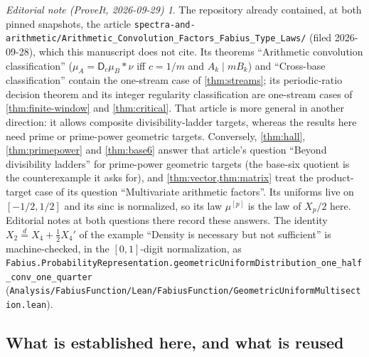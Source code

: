 \documentclass[11pt,a4paper]{article}
\theoremstyle{remark}
\newtheorem*{ednote}{Editorial note (ProveIt, 2026-09-29)}
\newcommand{\eqd}{\overset{d}{=}}
\newcommand{\pathtext}[1]{\nolinkurl{#1}}
\begin{document}
\begin{ednote}
The repository already contained, at both pinned snapshots, the article
\pathtext{spectra-and-arithmetic/Arithmetic_Convolution_Factors_Fabius_Type_Laws/}
(filed 2026-09-28), which this manuscript does not cite. Its theorems
``Arithmetic convolution classification'' ($\mu_A=\mathsf D_c\mu_B*\nu$ iff
$c=1/m$ and $A_k\mid mB_k$) and ``Cross-base classification'' contain the
one-stream case of \cref{thm:streams}; its periodic-ratio decision theorem
and its integer regularity classification are one-stream cases of
\cref{thm:finite-window} and \cref{thm:critical}. That article is more
general in another direction: it allows composite divisibility-ladder
targets, whereas the results here need prime or prime-power geometric
targets. Conversely, \cref{thm:hall}, \cref{thm:primepower} and
\cref{thm:base6} answer that article's question ``Beyond divisibility
ladders'' for prime-power geometric targets (the base-six quotient is the
counterexample it asks for), and \cref{thm:vector,thm:matrix} treat the
product-target case of its question ``Multivariate arithmetic factors''.
Its uniforms live on $[-1/2,1/2]$ and its sinc is normalized, so its law
$\mu^{[p]}$ is the law of $X_p/2$ here. Editorial notes at both questions
there record these answers. The identity $X_2\eqd X_4+\tfrac12X_4'$ of the
example ``Density is necessary but not sufficient'' is machine-checked, in the $[0,1]$-digit
normalization, as
\pathtext{Fabius.ProbabilityRepresentation.geometricUniformDistribution_one_half_conv_one_quarter}
(\pathtext{Analysis/FabiusFunction/Lean/FabiusFunction/GeometricUniformMultisection.lean}).
\end{ednote}

\subsection{What is established here, and what is reused}
\end{document}
